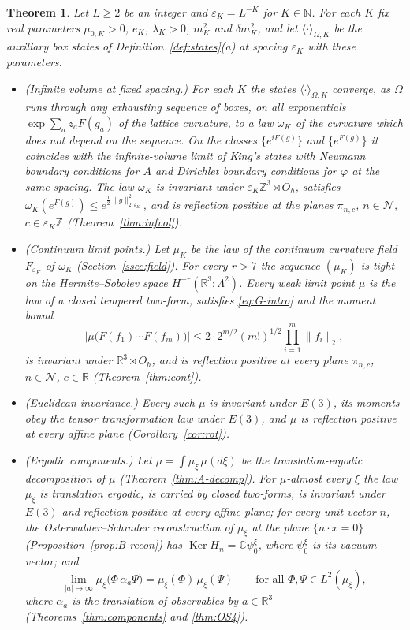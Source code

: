 \documentclass[11pt]{amsart}
\theoremstyle{plain}
\newtheorem{theorem}{Theorem}[section]
\theoremstyle{definition}
\theoremstyle{remark}
\numberwithin{equation}{section}
\newcommand{\R}{\mathbb{R}}
\newcommand{\Z}{\mathbb{Z}}
\newcommand{\N}{\mathbb{N}}
\newcommand{\C}{\mathbb{C}}
\newcommand{\eps}{\varepsilon}
\newcommand{\cN}{\mathcal{N}}
\newcommand{\Oh}{O_h}
\newcommand{\Eu}{E(3)}
\newcommand{\abs}[1]{\lvert #1\rvert}
\newcommand{\norm}[1]{\lVert #1\rVert}
\newcommand{\ev}[1]{\langle #1\rangle}
\newcommand{\Ker}{\operatorname{Ker}}
\begin{document}
\begin{theorem}\label{thm:main}
Let $L\ge2$ be an integer and $\eps_K=L^{-K}$ for $K\in\N$. For each $K$ fix real parameters $\mu_{0,K}>0$, $e_K$, $\lambda_K>0$, $m_K^2$ and $\delta m_K^2$, and let $\ev{\cdot}_{\Omega,K}$ be the auxiliary box states of Definition~\ref{def:states}(a) at spacing $\eps_K$ with these parameters.
\begin{itemize}
\item[(a)] (Infinite volume at fixed spacing.) For each $K$ the states $\ev{\cdot}_{\Omega,K}$ converge, as $\Omega$ runs through any exhausting sequence of boxes, on all exponentials $\exp\sum_az_aF(g_a)$ of the lattice curvature, to a law $\omega_K$ of the curvature which does not depend on the sequence. On the classes $\{e^{iF(g)}\}$ and $\{e^{F(g)}\}$ it coincides with the infinite-volume limit of King's states with Neumann boundary conditions for $A$ and Dirichlet boundary conditions for $\varphi$ at the same spacing. The law $\omega_K$ is invariant under $\eps_K\Z^3\rtimes\Oh$, satisfies $\omega_K(e^{F(g)})\le e^{\frac12\norm{g}_{2,\eps_K}^2}$, and is reflection positive at the planes $\pi_{n,c}$, $n\in\cN$, $c\in\eps_K\Z$ (Theorem~\ref{thm:infvol}).
\item[(b)] (Continuum limit points.) Let $\mu_K$ be the law of the continuum curvature field $F_{\eps_K}$ of $\omega_K$ (Section~\ref{ssec:field}). For every $r>7$ the sequence $(\mu_K)$ is tight on the Hermite--Sobolev space $H^{-r}(\R^3;\Lambda^2)$. Every weak limit point $\mu$ is the law of a closed tempered two-form, satisfies \eqref{eq:G-intro} and the moment bound
\begin{equation}\label{eq:moment-intro}
\abs{\mu\big(F(f_1)\cdots F(f_m)\big)}\le2\cdot2^{m/2}(m!)^{1/2}\prod_{i=1}^m\norm{f_i}_2 ,
\end{equation}
is invariant under $\R^3\rtimes\Oh$, and is reflection positive at every plane $\pi_{n,c}$, $n\in\cN$, $c\in\R$ (Theorem~\ref{thm:cont}).
\item[(c)] (Euclidean invariance.) Every such $\mu$ is invariant under $\Eu$, its moments obey the tensor transformation law under $\Eu$, and $\mu$ is reflection positive at every affine plane (Corollary~\ref{cor:rot}).
\item[(d)] (Ergodic components.) Let $\mu=\int\mu_\xi\,\mu(d\xi)$ be the translation-ergodic decomposition of $\mu$ (Theorem~\ref{thm:A-decomp}). For $\mu$-almost every $\xi$ the law $\mu_\xi$ is translation ergodic, is carried by closed two-forms, is invariant under $\Eu$ and reflection positive at every affine plane; for every unit vector $n$, the Osterwalder--Schrader reconstruction of $\mu_\xi$ at the plane $\{n\cdot x=0\}$ (Proposition~\ref{prop:B-recon}) has $\Ker H_n=\C\psi_0^\xi$, where $\psi_0^\xi$ is its vacuum vector; and
\begin{equation}\label{eq:cluster-intro}
\lim_{\abs{a}\to\infty}\mu_\xi\big(\Phi\,\alpha_a\Psi\big)=\mu_\xi(\Phi)\,\mu_\xi(\Psi)\qquad\text{for all }\Phi,\Psi\in L^2(\mu_\xi),
\end{equation}
where $\alpha_a$ is the translation of observables by $a\in\R^3$ (Theorems~\ref{thm:components} and \ref{thm:OS4}).
\end{itemize}
\end{theorem}
\end{document}
